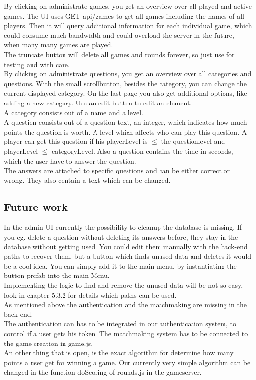 By clicking on administrate games, you get an overview over all played and active games. The UI uses GET api/games to get all games including the names of all players. Then it will query additional information for each individual game, which could consume much bandwidth and could overload the server in the future, when many many games are played.\\
The truncate button will delete all games and rounds forever, so just use for testing and with care.\\

By clicking on administrate questions, you get an overview over all categories and questions. With the small scrollbutton, besides the category, you can change the current displayed category. On the last page you also get additional options, like adding a new category. Use an edit button to edit an element.\\
A category consists out of a name and a level.\\
A question consists out of a question text, an integer, which indicates how much points the question is worth. A level which affects who can play this question. A player can get this question if his playerLevel is $\leq$ the questionlevel and playerLevel $\leq$ categoryLevel. Also a question contains the time in seconds, which the user have to answer the question.\\
The answers are attached to specific questions and can be either correct or wrong. They also contain a text which can be changed.

\subsection{Future work}
In the admin UI currently the possibility to cleanup the database is missing. If you eg. delete a question without deleting its answers before, they stay in the database without getting used. You could edit them manually with the back-end paths to recover them, but a button which finds unused data and deletes it would be a cool idea. You can simply add it to the main menu, by instantiating the button prefab into the main Menu.\\
Implementing the logic to find and remove the unused data will be not so easy, look in chapter 5.3.2 for details which paths can be used.\\

As mentioned above the authentication and the matchmaking are missing in the back-end.\\
The authentication can has to be integrated in our authentication system, to control if a user gets his token. The matchmaking system has to be connected to the game creation in game.js.\\

An other thing that is open, is the exact algorithm for determine how many points a user get for winning a game. Our currently very simple algorithm can be changed in the function doScoring of rounds.js in the gameserver.